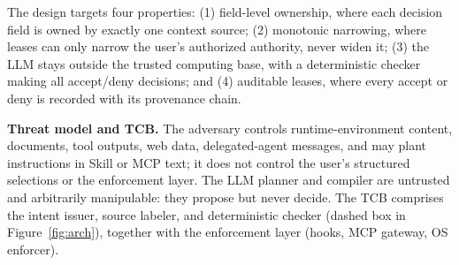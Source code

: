 \documentclass[sigconf,nonacm]{acmart}
\begin{document}
The design targets four properties: (1) field-level ownership, where each decision field is owned by exactly one context source; (2) monotonic narrowing, where leases can only narrow the user's authorized authority, never widen it; (3) the LLM stays outside the trusted computing base, with a deterministic checker making all accept/deny decisions; and (4) auditable leases, where every accept or deny is recorded with its provenance chain.

\textbf{Threat model and TCB.}
The adversary controls runtime-environment content, documents, tool outputs, web data, delegated-agent messages, and may plant instructions in Skill or MCP text; it does not control the user's structured selections or the enforcement layer.
The LLM planner and compiler are untrusted and arbitrarily manipulable: they propose but never decide.
The TCB comprises the intent issuer, source labeler, and deterministic checker (dashed box in Figure~\ref{fig:arch}), together with the enforcement layer (hooks, MCP gateway, OS enforcer).
\end{document}
